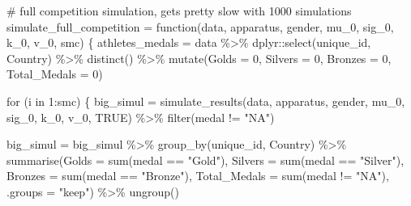 \documentclass[
  letterpaper,
  DIV=11,
  numbers=noendperiod]{scrartcl}
\newenvironment{Shaded}{\begin{snugshade}}{\end{snugshade}}
\newcommand{\AttributeTok}[1]{\textcolor[rgb]{0.40,0.45,0.13}{#1}}
\newcommand{\CommentTok}[1]{\textcolor[rgb]{0.37,0.37,0.37}{#1}}
\newcommand{\ConstantTok}[1]{\textcolor[rgb]{0.56,0.35,0.01}{#1}}
\newcommand{\ControlFlowTok}[1]{\textcolor[rgb]{0.00,0.23,0.31}{#1}}
\newcommand{\DecValTok}[1]{\textcolor[rgb]{0.68,0.00,0.00}{#1}}
\newcommand{\FunctionTok}[1]{\textcolor[rgb]{0.28,0.35,0.67}{#1}}
\newcommand{\NormalTok}[1]{\textcolor[rgb]{0.00,0.23,0.31}{#1}}
\newcommand{\OtherTok}[1]{\textcolor[rgb]{0.00,0.23,0.31}{#1}}
\newcommand{\SpecialCharTok}[1]{\textcolor[rgb]{0.37,0.37,0.37}{#1}}
\newcommand{\StringTok}[1]{\textcolor[rgb]{0.13,0.47,0.30}{#1}}
\begin{document}
\begin{Shaded}
\begin{Highlighting}[]
\CommentTok{\# full competition simulation, gets pretty slow with 1000 simulations}
\NormalTok{simulate\_full\_competition }\OtherTok{=} \ControlFlowTok{function}\NormalTok{(data, apparatus, gender, mu\_0, sig\_0, k\_0, v\_0, smc) \{}
\NormalTok{  athletes\_medals }\OtherTok{=}\NormalTok{ data }\SpecialCharTok{\%\textgreater{}\%}
\NormalTok{    dplyr}\SpecialCharTok{::}\FunctionTok{select}\NormalTok{(unique\_id, Country) }\SpecialCharTok{\%\textgreater{}\%}
    \FunctionTok{distinct}\NormalTok{() }\SpecialCharTok{\%\textgreater{}\%}
    \FunctionTok{mutate}\NormalTok{(}\AttributeTok{Golds =} \DecValTok{0}\NormalTok{, }\AttributeTok{Silvers =} \DecValTok{0}\NormalTok{, }\AttributeTok{Bronzes =} \DecValTok{0}\NormalTok{, }\AttributeTok{Total\_Medals =} \DecValTok{0}\NormalTok{)}
  
  \ControlFlowTok{for}\NormalTok{ (i }\ControlFlowTok{in} \DecValTok{1}\SpecialCharTok{:}\NormalTok{smc) \{    }
\NormalTok{    big\_simul }\OtherTok{=} \FunctionTok{simulate\_results}\NormalTok{(data, apparatus, gender, mu\_0, sig\_0, k\_0, v\_0, }\ConstantTok{TRUE}\NormalTok{) }\SpecialCharTok{\%\textgreater{}\%}
      \FunctionTok{filter}\NormalTok{(medal }\SpecialCharTok{!=} \StringTok{"NA"}\NormalTok{)}
    
\NormalTok{    big\_simul }\OtherTok{=}\NormalTok{ big\_simul }\SpecialCharTok{\%\textgreater{}\%}
      \FunctionTok{group\_by}\NormalTok{(unique\_id, Country) }\SpecialCharTok{\%\textgreater{}\%}
      \FunctionTok{summarise}\NormalTok{(}\AttributeTok{Golds =} \FunctionTok{sum}\NormalTok{(medal }\SpecialCharTok{==} \StringTok{"Gold"}\NormalTok{),}
                \AttributeTok{Silvers =} \FunctionTok{sum}\NormalTok{(medal }\SpecialCharTok{==} \StringTok{"Silver"}\NormalTok{),}
                \AttributeTok{Bronzes =} \FunctionTok{sum}\NormalTok{(medal }\SpecialCharTok{==} \StringTok{"Bronze"}\NormalTok{),}
                \AttributeTok{Total\_Medals =} \FunctionTok{sum}\NormalTok{(medal }\SpecialCharTok{!=} \StringTok{"NA"}\NormalTok{),}
                \AttributeTok{.groups =} \StringTok{"keep"}\NormalTok{) }\SpecialCharTok{\%\textgreater{}\%}
      \FunctionTok{ungroup}\NormalTok{()}
    

\end{Highlighting}
\end{Shaded}
\end{document}
